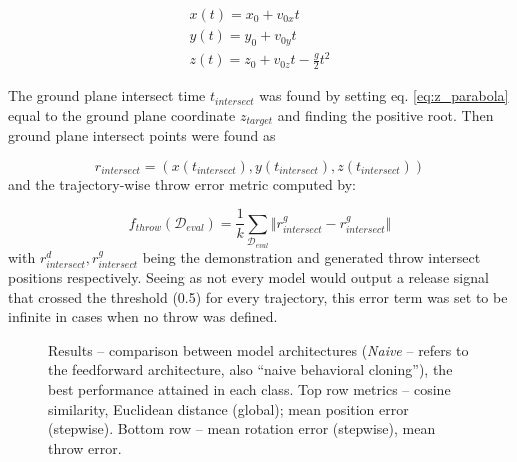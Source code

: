 \documentclass{article}
\begin{document}
\begin{align}
	x(t) = x_0 + v_{0x}t \\
	y(t) = y_0 + v_{0y}t  \\
	z(t) = z_0 + v_{0z}t - \frac{g}{2}t^2 \label{eq:z_parabola}
\end{align}

The ground plane intersect time $t_{intersect}$ was found by setting eq. \ref{eq:z_parabola} equal to the ground plane coordinate $z_{target}$ and finding the positive root. Then ground plane intersect points were found as 

\begin{equation}
	r_{intersect} = \left ( x(t_{intersect}), y(t_{intersect}), z(t_{intersect}) \right )
\end{equation}
and the trajectory-wise throw error metric computed by:

\begin{equation}
	f_{throw}(\mathcal{D}_{eval}) = \frac{1}{k}\sum_{\mathcal{D}_{eval}} \Vert r^g_{intersect} - r^g_{intersect}\Vert
\end{equation}
with $r^d_{intersect}, r^g_{intersect}$ being the demonstration and generated throw intersect positions respectively. Seeing as not every model would output a release signal that crossed the threshold (0.5) for every trajectory, this error term was set to be infinite in cases when no throw was defined.

\begin{figure}[!b]
	\centering
	\caption{Results -- comparison between model architectures (\emph{Naive} -- refers to the feedforward architecture, also ``naive behavioral cloning''), the best performance attained in each class. Top row metrics -- cosine similarity, Euclidean distance (global); mean position error (stepwise). Bottom row -- mean rotation error (stepwise), mean throw error.}
	\label{fig:res_model_compare}
\end{figure}
\end{document}
